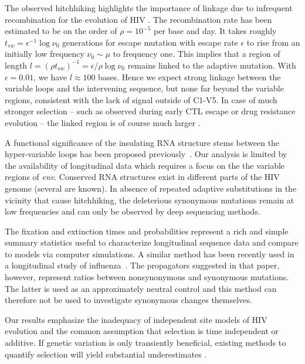 \documentclass[rmp, twocolumn]{revtex4}
\newcommand{\env}{\textit{env}}
\begin{document}
The observed hitchhiking highlights the importance of linkage due to infrequent
recombination for the evolution of HIV
\citep{neher_recombination_2010,batorsky_estimate_2011,
josefsson_majority_2011}. The recombination rate has been estimated to be on the
order of $\rho = 10^{-5}$ per base and day. It takes roughly $t_{sw} =
\epsilon^{-1} \log \nu_0$ generations for escape mutation with escape rate
$\epsilon$ to rise from an initially low frequency $\nu_0\sim \mu$ to frequency
one. This implies that a region of length $l = (\rho t_{sw})^{-1} = \epsilon /
\rho \log \nu_0$ remains linked to the adaptive mutation. With $\epsilon=0.01$,
we have $l\approx 100$ bases. Hence we expect strong linkage between the
variable loops and the intervening sequence, but none far beyond the variable
regions, consistent with the lack of signal outside of C1-V5. In case of much
stronger selection -- such as observed during early CTL escape or drug
resistance evolution -- the linked  region is of course much larger
\citep{nijhuis_stochastic_1998}.

A functional significance of the insulating RNA structure stems between the
hyper-variable loops has been proposed
previously~\citep{watts_architecture_2009, sanjuan_interplay_2011}.
Our analysis is limited by the availability of
longitudinal data which requires a focus on the the variable regions of \env.
Conserved RNA structures exist in different parts of the HIV genome (several are
known). In absence of repeated adaptive substitutions in the vicinity that cause
hitchhiking, the deleterious synonymous mutations remain at low frequencies and
can only be observed by deep sequencing methods. 

The fixation and extinction times and probabilities represent a rich and simple
summary statistics useful to characterize longitudinal sequence data and compare
to models via computer simulations.
A similar method has been recently used in a longitudinal study of
influenza~\citep{strelkowa_clonal_2012}. The propagators suggested in that
paper, however, represent ratios between nonsynonymous and synonymous mutations.
The latter is used as an approximately neutral control and this method can
therefore not be used to investigate synonymous changes themselves.

Our results emphasize the inadequacy of independent site
models of HIV evolution and the common assumption that selection is time
independent or additive. If genetic variation is only transiently beneficial,
existing methods to quantify selection will yield substantial underestimates
\citep{williamson_adaptation_2003,neher_rate_2010,batorsky_estimate_2011}.
\end{document}
